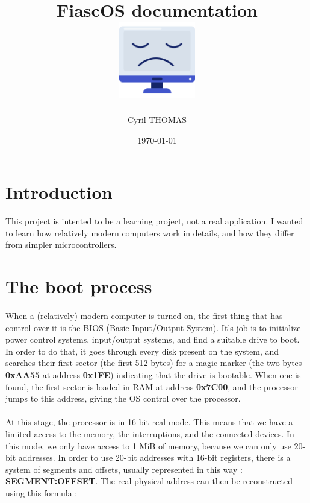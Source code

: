\documentclass[12pt,letterpaper]{article}
\title{FiascOS documentation \\
\vspace{2cm}
\includegraphics[width=0.25\textwidth]{Images/logo.png} \\
\vspace{2cm}}
\author{Cyril THOMAS}
\date{\today}
\begin{document}
\maketitle
\newpage
\tableofcontents

\newpage

\section{Introduction}
\paragraph{}
This project is intented to be a learning project, not a real application. I wanted to learn how relatively modern computers work in details, and how they differ from simpler microcontrollers.

\section{The boot process}
\paragraph{}
When a (relatively) modern computer is turned on, the first thing that has control over it is the BIOS (Basic Input/Output System). It's job is to initialize power control systems, input/output systems, and find a suitable drive to boot. In order to do that, it goes through every disk present on the system, and searches their first sector (the first 512 bytes) for a magic marker (the two bytes \textbf{0xAA55} at address \textbf{0x1FE}) indicating that the drive is bootable. When one is found, the first sector is loaded in RAM at address \textbf{0x7C00}, and the processor jumps to this address, giving the OS control over the processor.

\paragraph{}
At this stage, the processor is in 16-bit real mode. This means that we have a limited access to the memory, the interruptions, and the connected devices. In this mode, we only have access to 1 MiB of memory, because we can only use 20-bit addresses. In order to use 20-bit addresses with 16-bit registers, there is a system of segments and offsets, usually represented in this way : \textbf{SEGMENT:OFFSET}. The real physical address can then be reconstructed using this formula :
\end{document}
